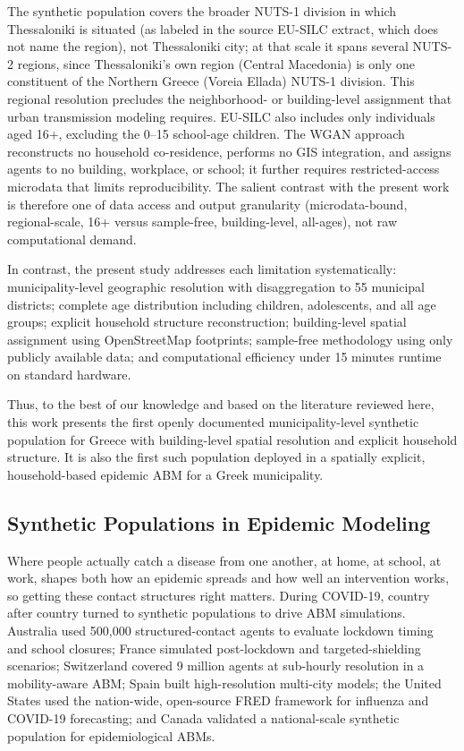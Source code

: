 \documentclass{article}
\begin{document}
The synthetic population covers the broader NUTS-1 division in which Thessaloniki is situated (as labeled in the source EU-SILC extract, which does not name the region), not Thessaloniki city; at that scale it spans several NUTS-2 regions, since Thessaloniki's own region (Central Macedonia) is only one constituent of the Northern Greece (Voreia Ellada) NUTS-1 division. This regional resolution precludes the neighborhood- or building-level assignment that urban transmission modeling requires. EU-SILC also includes only individuals aged 16+, excluding the 0--15 school-age children. The WGAN approach reconstructs no household co-residence, performs no GIS integration, and assigns agents to no building, workplace, or school; it further requires restricted-access microdata that limits reproducibility. The salient contrast with the present work is therefore one of data access and output granularity (microdata-bound, regional-scale, 16+ versus sample-free, building-level, all-ages), not raw computational demand.

In contrast, the present study addresses each limitation systematically: mu\-nicipality-level geographic resolution with disaggregation to 55 municipal districts; complete age distribution including children, adolescents, and all age groups; explicit household structure reconstruction; building-level spatial assignment using OpenStreetMap footprints; sample-free methodology using only publicly available data; and computational efficiency under 15 minutes runtime on standard hardware.

Thus, to the best of our knowledge and based on the literature reviewed here, this work presents the first openly documented municipality-level synthetic population for Greece with building-level spatial resolution and explicit household structure. It is also the first such population deployed in a spatially explicit, household-based epidemic ABM for a Greek municipality.

\subsection{Synthetic Populations in Epidemic Modeling}\label{synthetic-populations-in-epidemic-modeling}

Where people actually catch a disease from one another, at home, at school, at work, shapes both how an epidemic spreads and how well an intervention works, so getting these contact structures right matters. During COVID-19, country after country turned to synthetic populations to drive ABM simulations. Australia \citep{chang2020modelling} used 500,000 structured-contact agents to evaluate lockdown timing and school closures; France \citep{hoertel2020stochastic} simulated post-lockdown and targeted-shielding scenarios; Switzerland \citep{marini2020enerpol} covered 9 million agents at sub-hourly resolution in a mobility-aware ABM; Spain \citep{rodriguez2021highresolution} built high-resolution multi-city models; the United States \citep{Grefenstette2013} used the nation-wide, open-source FRED framework for influenza and COVID-19 forecasting; and Canada \citep{Predhumeau2023Canada} validated a national-scale synthetic population for epidemiological ABMs.
\end{document}
